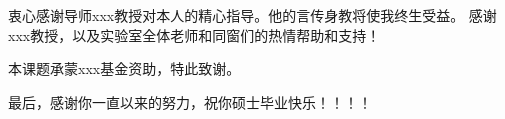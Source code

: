 
衷心感谢导师xxx教授对本人的精心指导。他的言传身教将使我终生受益。
感谢xxx教授，以及实验室全体老师和同窗们的热情帮助和支持！

本课题承蒙xxx基金资助，特此致谢。

最后，感谢你一直以来的努力，祝你硕士毕业快乐！！！！